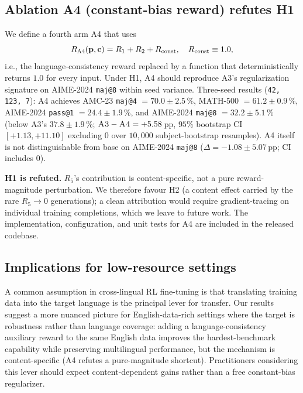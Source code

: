 \documentclass[journal,onecolumn,11pt]{IEEEtran}
\newcommand{\armC}{\textsc{A3}}
\newcommand{\armD}{\textsc{A4}}
\newcommand{\R}[1]{R_{#1}}
\begin{document}
\subsection{Ablation \armD{} (constant-bias reward) refutes H1}
We define a fourth arm \armD{} that uses
\begin{equation*}
R_{\armD{}}(\mathbf{p},\mathbf{c}) = \R{1}+\R{2}+\R{\text{const}}, \quad
\R{\text{const}} \equiv 1.0,
\end{equation*}
i.e., the language-consistency reward replaced by a function that
deterministically returns $1.0$ for every input. Under H1, \armD{}
should reproduce \armC{}'s regularization signature on AIME-2024
\texttt{maj@8} within seed variance. Three-seed results
(\texttt{42, 123, 7}): \armD{} achieves AMC-23 \texttt{maj@4}
$=70.0\pm 2.5$\,\%, MATH-500 $=61.2\pm 0.9$\,\%, AIME-2024
\texttt{pass@1} $=24.4\pm 1.9$\,\%, and AIME-2024 \texttt{maj@8}
$=32.2\pm 5.1$\,\% (below \armC{}'s $37.8\pm 1.9$\,\%;
$\armC{}-\armD{} = +5.58$\,pp, $95\%$ bootstrap CI $[+1.13, +11.10]$
excluding $0$ over $10{,}000$ subject-bootstrap resamples). \armD{}
itself is not distinguishable from base on AIME-2024 \texttt{maj@8}
($\Delta=-1.08\pm 5.07$\,pp; CI includes $0$).

\textbf{H1 is refuted.} $\R{5}$'s contribution is content-specific, not
a pure reward-magnitude perturbation. We therefore favour H2 (a content
effect carried by the rare $\R{5}\to 0$ generations); a clean
attribution would require gradient-tracing on individual training
completions, which we leave to future work. The implementation,
configuration, and unit tests for \armD{} are included in the released
codebase.

\subsection{Implications for low-resource settings}
A common assumption in cross-lingual RL fine-tuning is that translating
training data into the target language is the principal lever for
transfer. Our results suggest a more nuanced picture for English-data-rich
settings where the target is robustness rather than language coverage:
adding a language-consistency auxiliary reward to the same English data
improves the hardest-benchmark capability while preserving multilingual
performance, but the mechanism is content-specific (\armD{} refutes a
pure-magnitude shortcut). Practitioners considering this lever should
expect content-dependent gains rather than a free constant-bias
regularizer.
\end{document}
